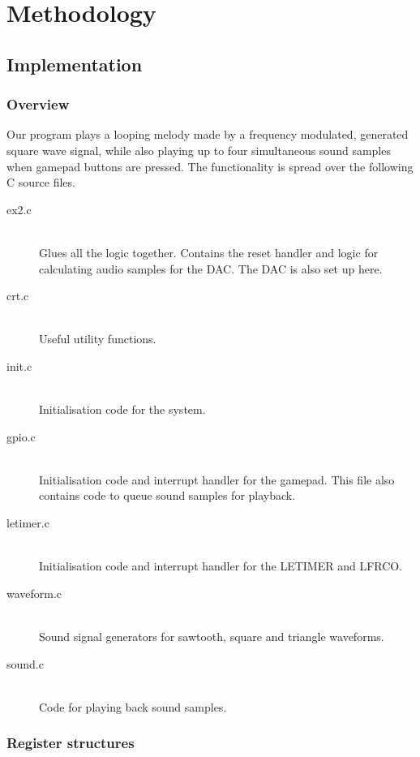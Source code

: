 \chapter{Methodology}

\section{Implementation}

\subsection{Overview}

Our program plays a looping melody made by a frequency modulated, generated
square wave signal, while also playing up to four simultaneous sound samples
when gamepad buttons are pressed. The functionality is spread over the following
C source files.

\begin{description}
\item[ex2.c] \hfill \\
	Glues all the logic together. Contains the reset handler and logic for
	calculating audio samples for the DAC. The DAC is also set up here.
\item[crt.c] \hfill \\
	Useful utility functions.
\item[init.c] \hfill \\
	Initialisation code for the system.
\item[gpio.c] \hfill \\
	Initialisation code and interrupt handler for the gamepad. This file also
	contains code to queue sound samples for playback.
\item[letimer.c] \hfill \\
	Initialisation code and interrupt handler for the LETIMER and LFRCO.
\item[waveform.c] \hfill \\
	Sound signal generators for sawtooth, square and triangle waveforms.
\item[sound.c] \hfill \\
	Code for playing back sound samples.
\end{description}

\subsection{Register structures}

